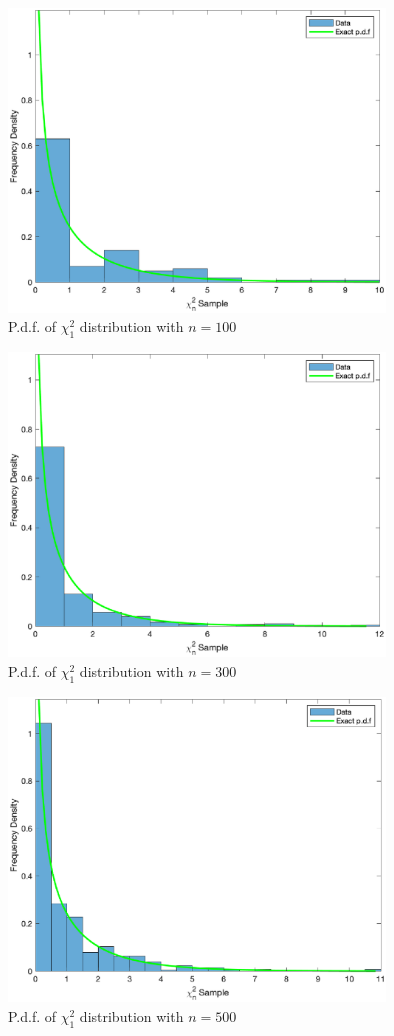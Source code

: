 \documentclass[10pt,a4paper,notitlepage]{article}
\begin{document}
\begin{figure}[H]
\centering
\includegraphics[width=10cm]{Image_13_1_1}
\caption{P.d.f. of $\chi_{1}^{2}$ distribution with $n=100$}\label{fg:13.1}
\end{figure}
\begin{figure}[H]
\centering
\includegraphics[width=10cm]{Image_13_1_2}
\caption{P.d.f. of $\chi_{1}^{2}$ distribution with $n=300$}
\end{figure}
\begin{figure}[H]
\centering
\includegraphics[width=10cm]{Image_13_1_3}
\caption{P.d.f. of $\chi_{1}^{2}$ distribution with $n=500$}
\end{figure}
\end{document}
